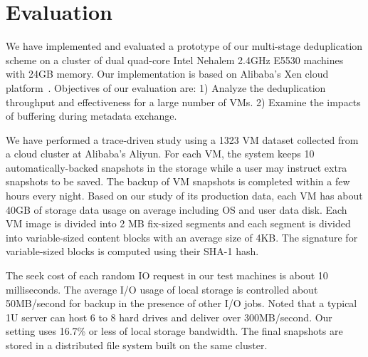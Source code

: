 
\section{Evaluation}
\label{sect:exper}

We have implemented and evaluated a prototype of our multi-stage deduplication scheme on a cluster
of dual quad-core Intel Nehalem 2.4GHz E5530 machines with 24GB memory.  
Our implementation is based on Alibaba's Xen cloud platform~\cite{Aliyun,WeiZhangIEEE}.
Objectives of our evaluation are:
1) Analyze the deduplication throughput and effectiveness for a large number of VMs.
2) Examine the impacts of buffering during metadata exchange.


We have performed a trace-driven study using  a 1323 VM dataset  collected from 
a cloud cluster at Alibaba's Aliyun.
For each VM, the system keeps 10 automatically-backed snapshots in the storage while
a user may instruct extra snapshots to be saved.
The backup of VM snapshots is completed within a few  hours every night.
Based on our study of its production  data,  each VM has about  40GB of storage  data usage on average
including OS and user data disk.
Each VM image is  divided into 2 MB fix-sized segments and each segment is divided into 
variable-sized content blocks  with an average size of 4KB.
The signature for variable-sized blocks is computed using their SHA-1 hash. 

The seek cost of each random IO request in our test machines is about  10 milliseconds.
The average I/O usage of local storage is controlled about 50MB/second for backup 
in the presence of other I/O jobs. Noted that a typical 1U server can host
6 to 8  hard drives and deliver over 300MB/second. Our setting uses 16.7\% or less 
of local storage bandwidth. 
The final snapshots are stored in a distributed file system built on the same 
cluster. 

